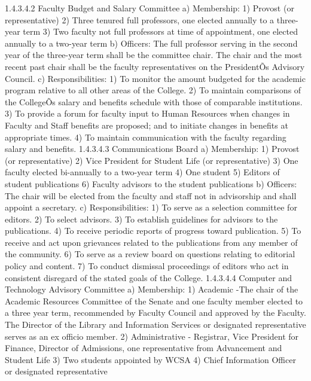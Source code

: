 \documentclass[letterpaper, 11pt]{article}
\begin{document}
			1.4.3.4.2   Faculty Budget and Salary Committee
			a) Membership:
			1) Provost (or representative)
			2) Three tenured full professors, one elected annually to a three-year term
			3) Two faculty not full professors at time of appointment, one elected annually to a two-year term
			b) Officers:
			The full professor serving in the second year of the three-year term shall be the committee chair.  The chair and the most recent past chair shall be the faculty representatives on the PresidentÕs Advisory Council.
			c) Responsibilities:
			1) To monitor the amount budgeted for the academic program relative to all other areas of the College.
			2) To maintain comparisons of the CollegeÕs salary and benefits schedule with those of comparable institutions.
			3) To provide a forum for faculty input to Human Resources when changes in Faculty and Staff benefits are proposed; and to initiate changes in benefits at appropriate times.
			4) To maintain communication with the faculty regarding salary and benefits.
			1.4.3.4.3 Communications Board
			a) Membership:
			1) Provost (or representative)
			2) Vice President for Student Life (or representative)
			3) One faculty elected bi-annually to a two-year term
			4) One student
			5) Editors of student publications
			6) Faculty advisors to the student publications
			b) Officers:
			The chair will be elected from the faculty and staff not in advisorship and shall appoint a secretary.
			c) Responsibilities:
			1) To serve as a selection committee for editors.
			2) To select advisors.
			3) To establish guidelines for advisors to the publications.
			4) To receive periodic reports of progress toward publication.
			5) To receive and act upon grievances related to the publications from any member of the community.
			6) To serve as a review board on questions relating to editorial policy and content.
			7) To conduct dismissal proceedings of editors who act in consistent disregard of the stated goals of the College.
			1.4.3.4.4 Computer and Technology Advisory Committee
			a) Membership:
			1) Academic -The chair of the Academic Resources Committee of the Senate and one faculty member elected to a three year term, recommended by Faculty Council and approved by the Faculty.  The Director of the Library and Information Services or designated representative serves as an ex officio member.
			2) Administrative - Registrar, Vice President for Finance, Director of Admissions, one representative from Advancement and Student Life
			3) Two students appointed by WCSA
			4) Chief Information Officer or designated representative
\end{document}
